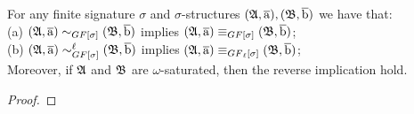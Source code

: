 \documentclass[a4paper,UKenglish,cleveref, autoref, thm-restate, hideLIPIcs]{lipics-v2021}
\begin{document}
\begin{lemma}
For any finite signature $\sigma$ and $\sigma$-structures $({\mathfrak{A}}, \overline{\mathrm{a}}), ({\mathfrak{B}}, \overline{\mathrm{b}})$ we have that:\\
(a) $(\str{A}, \elemtuplea) \bisimto_{\GF[\sigma]} (\str{B}, \elemtupleb)$ implies $(\str{A}, \elemtuplea) \equiv_{\GF[\sigma]} (\str{B}, \elemtupleb)$;\\
(b) $(\str{A}, \elemtuplea) \bisimto_{\GF[\sigma]}^{\ell} (\str{B}, \elemtupleb)$ implies $(\str{A}, \elemtuplea) \equiv_{\GF_\ell[\sigma]} (\str{B}, \elemtupleb)$;\\
Moreover, if ${\mathfrak{A}}$ and ${\mathfrak{B}}$ are $\omega$-saturated, then the reverse implication hold.
\end{lemma}
\begin{proof}
\end{proof}


\clearpage

\end{document}
